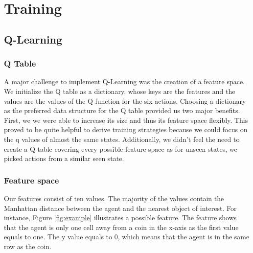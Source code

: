 \documentclass[
	letterpaper, %
	10pt, %
]{CSUniSchoolLabReport}
\begin{document}
\section{Training}
\subsection{Q-Learning}

\subsubsection*{Q Table}
A major challenge to implement Q-Learning was the creation of a feature space.
We initialize the Q table as a dictionary, whose keys are the features and the values are the values of the Q function for the six
actions.
Choosing a dictionary as the preferred data structure for the Q table provided us
two major benefits.
First, we we were able to increase its size and thus its feature space flexibly.
This proved to be quite helpful to derive training strategies because we
could focus on the q values of almost the same states.
Additionally, we didn't feel the need to create a Q table covering every possible
feature space as for unseen states, we picked actions from a similar seen state.

\subsubsection*{Feature space}
Our features consist of ten values. The majority of the values contain the Manhattan distance between
the agent and the nearest object of interest. For instance, Figure \ref{fig:example} illustrates a possible feature.
The feature shows that the agent is only one cell away from a coin in the x-axis as the first value equals to one.
The y value equals to 0, which means that the agent is in the same row as the coin.
\end{document}
